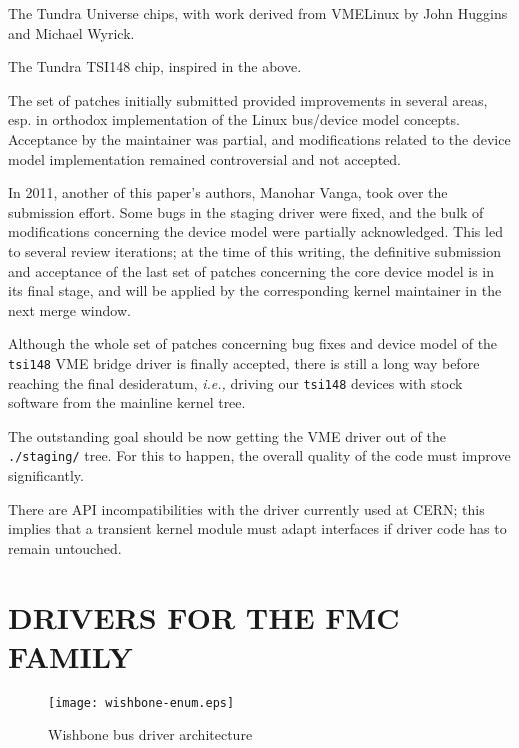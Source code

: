 \documentclass{JAC2003}
\begin{document}
\begin{Itemize}
\item The Tundra Universe chips, with work derived from VMELinux by John
Huggins and Michael Wyrick.
\item The Tundra TSI148 chip, inspired in the above.
\end{Itemize}

The set of patches initially submitted provided improvements in several areas,
esp. in orthodox implementation of the Linux bus/device model concepts.
Acceptance by the maintainer was partial, and modifications related to the
device model implementation remained controversial and not accepted.

In 2011, another of this paper's authors, Manohar Vanga, took over the
submission effort. Some bugs in the staging driver were fixed, and the bulk
of modifications concerning the device model were partially acknowledged. This
led to several review iterations; at the time of this writing, the definitive
submission and acceptance of the last set of patches concerning the core
device model is in its final stage, and will be applied by the corresponding
kernel maintainer in the next merge window.

Although the whole set of patches concerning bug fixes and device model of the
\verb|tsi148| VME bridge driver is finally accepted, there is still a long
way before reaching the final desideratum, \emph{i.e.,} driving our
\verb|tsi148| devices with stock software from the mainline kernel tree.
\begin{Itemize}
\item The outstanding goal should be now getting the VME driver out of the
\verb|./staging/| tree. For this to happen, the overall quality of the code must improve significantly.~\cite{staging}
\item There are API  incompatibilities with the driver currently used at
CERN; this implies that a transient kernel module must adapt interfaces
if driver code has to remain untouched.
\end{Itemize}

\section{DRIVERS FOR THE FMC FAMILY}

\begin{figure}[t]
   \centering
   \texttt{[image: wishbone-enum.eps]}
   \caption{Wishbone bus driver architecture}
   \label{wishbone-enum}
\end{figure}
\end{document}
